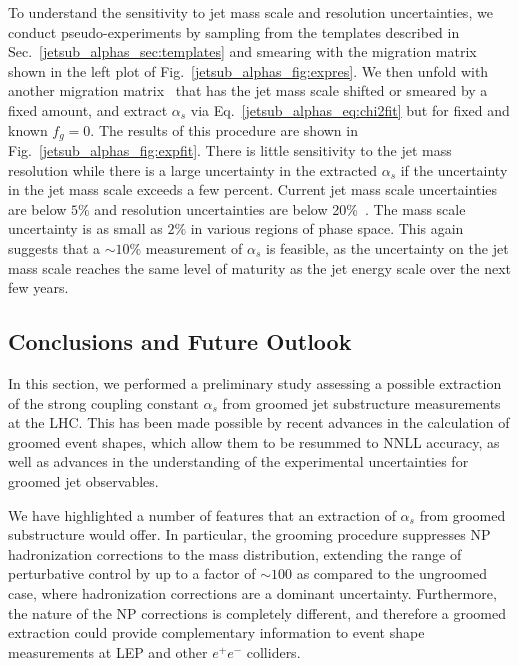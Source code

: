 \documentclass[11pt]{cernrep}
\begin{document}
To understand the sensitivity to jet mass scale and resolution uncertainties, we conduct pseudo-experiments by sampling from the templates described in Sec.~\ref{jetsub_alphas_sec:templates} and smearing with the migration matrix shown in the left plot of Fig.~\ref{jetsub_alphas_fig:expres}.
%
We then unfold with another migration matrix~\cite{DAgostini:1994fjx,Adye:2011gm} that has the jet mass scale shifted or smeared by a fixed amount, and extract $\alpha_s$ via Eq.~\eqref{jetsub_alphas_eq:chi2fit} but for fixed and known $f_g=0$.
%
The results of this procedure are shown in Fig.~\ref{jetsub_alphas_fig:expfit}.
%
There is little sensitivity to the jet mass resolution while there is a large uncertainty in the extracted $\alpha_s$ if the uncertainty in the jet mass scale exceeds a few percent.
%
Current jet mass scale uncertainties are below $5\%$ and resolution uncertainties are below 20\%~\cite{ATLAS-CONF-2017-063,CMS-PAS-JME-16-003}.
%
The mass scale uncertainty is as small as $2\%$ in various regions of phase space.
%
This again suggests that a $\sim 10\%$ measurement of $\alpha_s$ is feasible, as the uncertainty on the jet mass scale reaches the same level of maturity as the jet energy scale over the next few years.

\subsection{Conclusions and Future Outlook}
\label{jetsub_alphas_sec:future}

In this section, we performed a preliminary study assessing a possible extraction of the strong coupling constant $\alpha_s$ from groomed jet substructure measurements at the LHC.
%
This has been made possible by recent advances in the calculation of groomed event shapes, which allow them to be resummed to NNLL accuracy, as well as advances in the understanding of the experimental uncertainties for groomed jet observables.
 
We have highlighted a number of features that an extraction of $\alpha_s$ from groomed substructure would offer.
%
In particular, the grooming procedure suppresses NP hadronization corrections to the mass distribution, extending the range of perturbative control by up to a factor of $\sim 100$ as compared to the ungroomed case, where hadronization corrections are a dominant uncertainty.
%
Furthermore, the nature of the NP corrections is completely different, and therefore a groomed extraction could provide complementary information to event shape measurements at LEP and other $e^+e^-$ colliders. 
\end{document}
